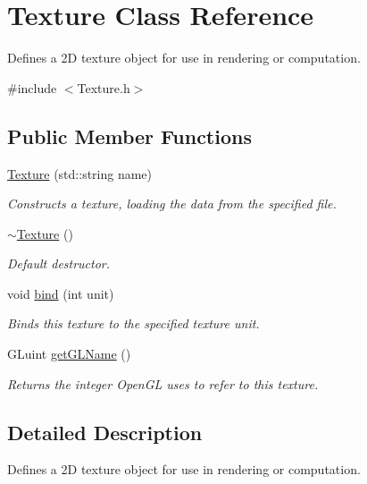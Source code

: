 \hypertarget{class_texture}{\section{Texture Class Reference}
\label{class_texture}
}


Defines a 2\-D texture object for use in rendering or computation.  




{\ttfamily \#include $<$Texture.\-h$>$}

\subsection*{Public Member Functions}
\begin{DoxyCompactItemize}
\item 
\hyperlink{class_texture_a657517c71c4ca57cf8fdc992247a575c}{Texture} (std\-::string name)
\begin{DoxyCompactList}\small\item\em Constructs a texture, loading the data from the specified file. \end{DoxyCompactList}\item 
\hypertarget{class_texture_a09c4bcb7462f64c1d20fa69dba3cee8a}{\hyperlink{class_texture_a09c4bcb7462f64c1d20fa69dba3cee8a}{$\sim$\-Texture} ()}\label{class_texture_a09c4bcb7462f64c1d20fa69dba3cee8a}

\begin{DoxyCompactList}\small\item\em Default destructor. \end{DoxyCompactList}\item 
void \hyperlink{class_texture_ab13af2ee5ae56a8d74074fdf66100cd7}{bind} (int unit)
\begin{DoxyCompactList}\small\item\em Binds this texture to the specified texture unit. \end{DoxyCompactList}\item 
G\-Luint \hyperlink{class_texture_ac00c7ad03134ffb35987891627ef8cff}{get\-G\-L\-Name} ()
\begin{DoxyCompactList}\small\item\em Returns the integer Open\-G\-L uses to refer to this texture. \end{DoxyCompactList}\end{DoxyCompactItemize}


\subsection{Detailed Description}
Defines a 2\-D texture object for use in rendering or computation. 

